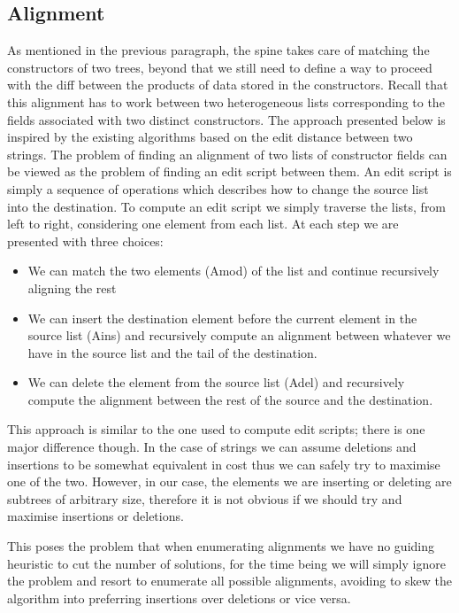 \documentclass[11pt]{article}
\begin{document}
\subsection{Alignment}\label{alignment}

As mentioned in the previous paragraph, the spine takes care of matching
the constructors of two trees, beyond that we still need to define a way
to proceed with the diff between the products of data stored in the constructors.
Recall that this alignment has to work between two heterogeneous lists
corresponding to the fields associated with two distinct constructors.
The approach presented below is inspired by the existing algorithms
based on the edit distance between two strings. The problem of finding
an alignment of two lists of constructor fields can be viewed as the
problem of finding an edit script between them. An edit script is
simply a sequence of operations which describes how to change the source
list into the destination. To compute an edit script we simply
traverse the lists, from left to right, considering one element from each
list. At each step we are presented with three choices:

\begin{itemize}
\item
  We can match the two elements (Amod) of the list and continue
  recursively aligning the rest
\item
  We can insert the destination element before the current element in
  the source list (Ains) and recursively compute an alignment between
  whatever we have in the source list and the tail of the destination.
\item
  We can delete the element from the source list (Adel) and recursively
  compute the alignment between the rest of the source and the
  destination.
\end{itemize}

This approach is similar to the one used to compute edit scripts; there is one major difference though. In the
case of strings we can assume deletions and insertions to be somewhat
equivalent in cost thus we can safely try to maximise one of the two.
However, in our case, the elements we are inserting or deleting are
subtrees of arbitrary size, therefore it is not obvious if we should try and maximise
insertions or deletions.

This poses the problem that when enumerating alignments we have no guiding heuristic to cut the number
of solutions, for the time being we will simply ignore the problem and resort to enumerate
all possible alignments, avoiding to skew the algorithm into preferring
insertions over deletions or vice versa.
\end{document}
